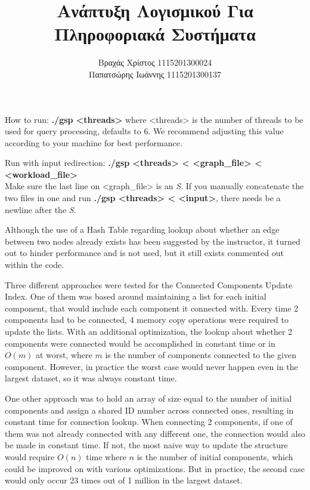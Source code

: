 \documentclass[12pt]{article}
\title{Ανάπτυξη Λογισμικού Για Πληροφοριακά Συστήματα}
\author{Βραχάς Χρίστος 1115201300024\\Παπατσώρης Ιωάννης 1115201300137}
\date{}
\begin{document}
\maketitle

How to run: \textbf{./gsp <threads>} 
	where <threads> is the number of threads to be used for query processing, defaults to 6.
	We recommend adjusting this value according to your machine for best performance.

Run with input redirection: \textbf{./gsp <threads> < <graph\_file> < <workload\_file>}\\
	Make sure the last line on <graph\_file> is an \textit{S}.
	If you manually concatenate the two files in one and run \textbf{./gsp <threads> < <input>}, 
	there needs be a newline after the \textit{S}.

\vspace{5mm}

Although the use of a Hash Table regarding lookup about whether an edge between two nodes already exists has been suggested by the instructor, it turned out to hinder performance and is not used, but it still exists commented out within the code.

\vspace{5mm}

Three different approaches were tested for the Connected Components Update Index.
One of them was based around maintaining a list for each initial component, that would include each component it connected with.
Every time 2 components had to be connected, 4 memory copy operations were required to update the lists.
With an additional optimization, the lookup about whether 2 components were connected would be accomplished
in constant time or in $O(m)$ at worst, where $m$ is the number of components connected to the given component. 
However, in practice the worst case would never happen even in the largest dataset, so it was always constant time.

One other approach was to hold an array of size equal to the number of initial components and assign
a shared ID number across connected ones, resulting in constant time for connection lookup.
When connecting 2 components, if one of them was not already connected with any different one, the connection would also be made in constant time.
If not, the most naive way to update the structure would require $O(n)$ time where $n$ is the number of initial components, which could be improved on with various optimizations.
But in practice, the second case would only occur 23 times out of 1 million in the largest dataset.
\end{document}
